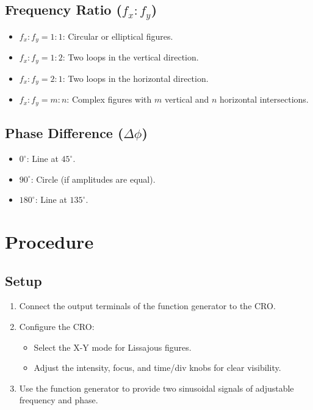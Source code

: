 \documentclass[a4paper,12pt]{article}
\begin{document}
\subsection*{\color{mygreen}Frequency Ratio ($f_x : f_y$)}
\begin{itemize}
    \item $f_x : f_y = 1:1$: Circular or elliptical figures.
    \item $f_x : f_y = 1:2$: Two loops in the vertical direction.
    \item $f_x : f_y = 2:1$: Two loops in the horizontal direction.
    \item $f_x : f_y = m:n$: Complex figures with $m$ vertical and $n$ horizontal intersections.
\end{itemize}

\subsection*{\color{mygreen}Phase Difference ($\Delta\phi$)}
\begin{itemize}
    \item $0^\circ$: Line at $45^\circ$.
    \item $90^\circ$: Circle (if amplitudes are equal).
    \item $180^\circ$: Line at $135^\circ$.
\end{itemize}

\section*{\color{myblue}Procedure}

\subsection*{\color{myred}Setup}
\begin{enumerate}
    \item Connect the output terminals of the function generator to the CRO.
    \item Configure the CRO:
    \begin{itemize}
        \item Select the X-Y mode for Lissajous figures.
        \item Adjust the intensity, focus, and time/div knobs for clear visibility.
    \end{itemize}
    \item Use the function generator to provide two sinusoidal signals of adjustable frequency and phase.
\end{enumerate}
\end{document}
